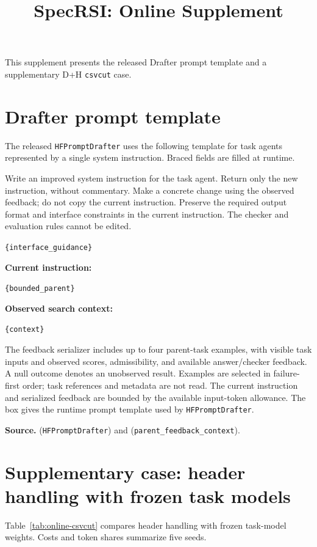 \documentclass[10pt]{article}
\title{SpecRSI: Online Supplement}
\author{}\date{}
\begin{document}
\maketitle
\noindent This supplement presents the released Drafter prompt template and a supplementary D+H \texttt{csvcut} case.
\section{Drafter prompt template}
The released \texttt{HFPromptDrafter} uses the following template for task agents represented by a single system instruction. Braced fields are filled at runtime.

\begin{tcolorbox}[
enhanced,
colback=black!5,
colframe=black!75,
colbacktitle=black!75,
coltitle=white,
title={Prompt O1. Drafter for task-agent instructions},
fonttitle=\large\rmfamily,
fontupper=\normalsize,
boxrule=0.5pt,
arc=1.5mm,
left=3mm,
right=3mm,
top=2.5mm,
bottom=2.5mm,
before skip=9pt,
after skip=9pt
]
Write an improved system instruction for the task agent. Return only the new instruction, without commentary. Make a concrete change using the observed feedback; do not copy the current instruction. Preserve the required output format and interface constraints in the current instruction. The checker and evaluation rules cannot be edited.

\medskip
\texttt{\{interface\_guidance\}}

\medskip
\textbf{Current instruction:}\par
\texttt{\{bounded\_parent\}}

\medskip
\textbf{Observed search context:}\par
\texttt{\{context\}}
\end{tcolorbox}
\noindent The feedback serializer includes up to four parent-task examples, with visible task inputs and observed scores, admissibility, and available answer/checker feedback. A null outcome denotes an unobserved result. Examples are selected in failure-first order; task references and metadata are not read. The current instruction and serialized feedback are bounded by the available input-token allowance. The box gives the runtime prompt template used by \texttt{HFPromptDrafter}.

\smallskip
\noindent\textbf{Source.}  (\texttt{HFPromptDrafter}) and  (\texttt{parent\_feedback\_context}).

\clearpage
\section{Supplementary case: header handling with frozen task models}
Table~\ref{tab:online-csvcut} compares header handling with frozen task-model weights. Costs and token shares summarize five seeds.
\end{document}
